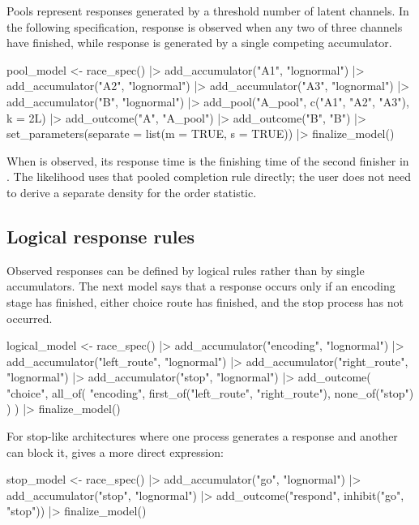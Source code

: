 \documentclass[article]{jss}
\newcommand{\fct}[1]{\code{#1()}}
\begin{document}
Pools represent responses generated by a threshold number of latent channels.
In the following specification, response  is observed when any two of
three  channels have finished, while response  is generated by
a single competing accumulator.

\begin{Code}
pool_model <- race_spec() |>
  add_accumulator("A1", "lognormal") |>
  add_accumulator("A2", "lognormal") |>
  add_accumulator("A3", "lognormal") |>
  add_accumulator("B", "lognormal") |>
  add_pool("A_pool", c("A1", "A2", "A3"), k = 2L) |>
  add_outcome("A", "A_pool") |>
  add_outcome("B", "B") |>
  set_parameters(separate = list(m = TRUE, s = TRUE)) |>
  finalize_model()
\end{Code}

When  is observed, its response time is the finishing time of the
second finisher in . The likelihood uses that pooled completion
rule directly; the user does not need to derive a separate density for the
order statistic.

\subsection{Logical response rules}

Observed responses can be defined by logical rules rather than by single
accumulators. The next model says that a response occurs only if an encoding
stage has finished, either choice route has finished, and the stop process has
not occurred.

\begin{Code}
logical_model <- race_spec() |>
  add_accumulator("encoding", "lognormal") |>
  add_accumulator("left_route", "lognormal") |>
  add_accumulator("right_route", "lognormal") |>
  add_accumulator("stop", "lognormal") |>
  add_outcome(
    "choice",
    all_of(
      "encoding",
      first_of("left_route", "right_route"),
      none_of("stop")
    )
  ) |>
  finalize_model()
\end{Code}

For stop-like architectures where one process generates a response and another
can block it, \fct{inhibit} gives a more direct expression:

\begin{Code}
stop_model <- race_spec() |>
  add_accumulator("go", "lognormal") |>
  add_accumulator("stop", "lognormal") |>
  add_outcome("respond", inhibit("go", "stop")) |>
  finalize_model()
\end{Code}
\end{document}
